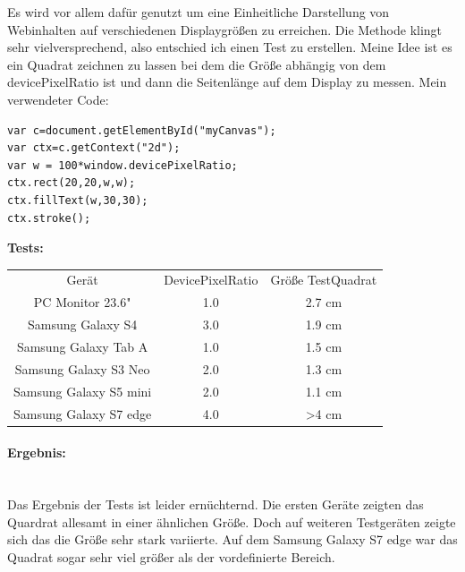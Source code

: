 Es wird vor allem dafür genutzt um eine Einheitliche Darstellung von Webinhalten auf verschiedenen Displaygrößen zu erreichen.
\newline
Die Methode klingt sehr vielversprechend, also entschied ich einen Test zu erstellen. Meine Idee ist es ein Quadrat zeichnen zu lassen bei dem die Größe abhängig von dem devicePixelRatio ist und dann die Seitenlänge auf dem Display zu messen.
Mein verwendeter Code:
\begin{lstlisting}
var c=document.getElementById("myCanvas");
var ctx=c.getContext("2d");
var w = 100*window.devicePixelRatio;
ctx.rect(20,20,w,w);
ctx.fillText(w,30,30); 
ctx.stroke(); 
\end{lstlisting}

\textbf{Tests:}
\newline
\begin{tabular}{ccc}
	Gerät                  & DevicePixelRatio & Größe TestQuadrat   \\
	PC Monitor 23.6"       & 1.0              & 2.7 cm              \\
	Samsung Galaxy S4      & 3.0              & 1.9 cm              \\
	Samsung Galaxy Tab A   & 1.0              & 1.5 cm              \\
	Samsung Galaxy S3 Neo  & 2.0              & 1.3 cm              \\
	Samsung Galaxy S5 mini & 2.0              & 1.1 cm              \\
	Samsung Galaxy S7 edge & 4.0              & >4 cm               \\
\end{tabular}
\paragraph{Ergebnis:}
\mbox{}\\
Das Ergebnis der Tests ist leider ernüchternd. Die ersten Geräte zeigten das Quardrat allesamt in einer ähnlichen Größe. Doch auf weiteren Testgeräten zeigte sich das die Größe sehr stark variierte. Auf dem Samsung Galaxy S7 edge war das Quadrat sogar sehr viel größer als der vordefinierte Bereich.
\newpage
